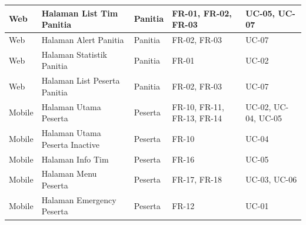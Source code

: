 \begin{longtable}{|p{1.5cm}|p{3.6cm}|p{3.3cm}|p{2cm}|p{2cm}|}
Web & Halaman List Tim Panitia & Panitia & FR-01, FR-02, FR-03 & UC-05, UC-07 \\ \hline

Web & Halaman Alert Panitia & Panitia & FR-02, FR-03 & UC-07 \\ \hline

Web & Halaman Statistik Panitia & Panitia & FR-01 & UC-02 \\ \hline

Web & Halaman List Peserta Panitia & Panitia & FR-02, FR-03 & UC-07 \\ \hline

Mobile & Halaman Utama Peserta & Peserta & FR-10, FR-11, FR-13, FR-14 & UC-02, UC-04, UC-05 \\ \hline

Mobile & Halaman Utama Peserta Inactive & Peserta & FR-10 & UC-04 \\ \hline

Mobile & Halaman Info Tim & Peserta & FR-16 & UC-05 \\ \hline

Mobile & Halaman Menu Peserta & Peserta & FR-17, FR-18 & UC-03, UC-06 \\ \hline

Mobile & Halaman Emergency Peserta & Peserta & FR-12 & UC-01 \\ \hline

\end{longtable}